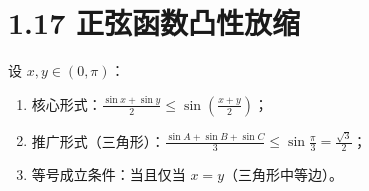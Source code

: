 \documentclass{article}
\begin{document}
\section*{1.17 正弦函数凸性放缩}
设 \( x,y \in (0,\pi) \)：
\begin{enumerate}
    \item 核心形式：\( \frac{\sin x+\sin y}{2} \leq \sin\!\left(\frac{x+y}{2}\right) \)；
    \item 推广形式（三角形）：\( \frac{\sin A+\sin B+\sin C}{3} \leq \sin\frac{\pi}{3} = \frac{\sqrt{3}}{2} \)；
    \item 等号成立条件：当且仅当 \( x=y \)（三角形中等边）。
\end{enumerate}
\end{document}
